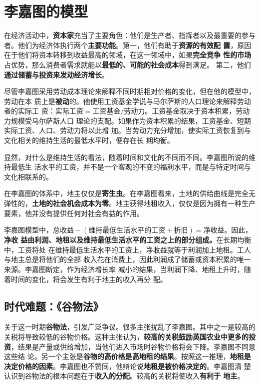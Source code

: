 \section{李嘉图的模型}

在经济活动中，\textbf{资本家}充当了主要角色：他们是生产者、指挥者以及最重要的参与
者。他们为经济体执行两个\textbf{主要功能}。第一，他们有助于\textbf{资源的有效配
  置}，原因在于他们将资本转移到收益最高的领域，在这一领域中，如果\textbf{完全竞争
  性的市场}占优势，那么消费者需求就能以\textbf{最低的、可能的社会成本}得到满足。
第二，他们\textbf{通过储蓄与投资来发动经济增长}。

尽管李嘉图采用劳动成本理论来解释不同时期相对价格的变化，但在他的模型中，劳动在本
质上是\textbf{被动}的。他使用工资基金学说与马尔萨斯的人口理论来解释劳动者的实际工
资：$实际工资=工资基金/劳动力$。工资基金取决于资本积累，劳动力规模受马尔萨斯人口
理论的支配。如果作为资本积累的结果，工资基金、短期实际工资、人口、劳动力将以此增
加。当劳动力充分增加，使实际工资恢复到与文化相关的维持生活的最低水平时，便存在长
期均衡。

显然，对什么是维持生活的看法，随着时间和文化的不同而不同。李嘉图所说的维持最低生
活水平的工资，并不是一个客观的不变的福利水平，而是与特定时间与文化相联系的。

在李嘉图的体系中，地主仅仅是\textbf{寄生虫}。在李嘉图看来，土地的供给曲线是完全无
弹性的，\textbf{土地的社会机会成本为零}。地主获得地租收入，仅仅是因为拥有一种生产
要素，他并没有提供任何对社会有益的作用。

李嘉图模型中，$总收益 - (维持最低生活水平的工资+折旧)=净收益$。因此，\textbf{净收
  益由利润、地租以及维持最低生活水平的工资之上的部分组成。}在长期均衡中，工资将处
在维持最低生活水平的工资上，净收益就等于利润加上地租。工人与地主总是将他们的全部
收入花在消费上，因此利润成了储蓄或资本积累的唯一来源。李嘉图断定，作为经济增长率
减小的结果，当利润下降、地租上升时，随着时间的变化，将会发生有利于地主的收入再分
配。

\subsection{时代难题：《谷物法》}

关于这一时期\textbf{谷物法}，引发广泛争议。很多主张扰乱了李嘉图。其中之一是较高的
关税将导致较低的谷物价格。这种主张认为，\textbf{较高的关税鼓励英国农业中更多的投
  资}，结果是产量或供给增加，当他们进入市场时谷物价格将会下降。李嘉图不同意这些结
论。另一个主张是\textbf{谷物的高价格是高地租的结果}。按照这一推理，\textbf{地租是
  决定价格的因素}。李嘉图也不赞同，他辩论说\textbf{地租是被价格决定的}。李嘉图清
楚认识到谷物法的根本问题在于\textbf{收入的分配}。较高的关税将使收入\textbf{有利于
  地主}。

